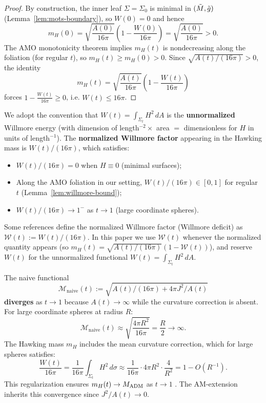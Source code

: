 \begin{proof}
By construction, the inner leaf $\Sigma = \Sigma_0$ is minimal in $(\tilde{M}, \tilde{g})$ (Lemma~\ref{lem:mots-boundary}), so $W(0)=0$ and hence
\[
m_H(0) = \sqrt{\frac{A(0)}{16\pi}}\left(1-\frac{W(0)}{16\pi}\right)=\sqrt{\frac{A(0)}{16\pi}}>0.
\]
The AMO monotonicity theorem implies $m_H(t)$ is nondecreasing along the foliation (for regular $t$), so $m_H(t) \ge m_H(0) > 0$.
Since $\sqrt{A(t)/(16\pi)}>0$, the identity
\[
m_H(t)=\sqrt{\frac{A(t)}{16\pi}}\left(1-\frac{W(t)}{16\pi}\right)
\]
forces $1-\frac{W(t)}{16\pi} \ge 0$, i.e. $W(t)\le 16\pi$.
\end{proof}

\begin{remark}\label{rem:willmore-notation}
We adopt the convention that $W(t) = \int_{\Sigma_t} H^2 \, dA$ is the \textbf{unnormalized} Willmore energy (with dimension of length$^{-2} \times$ area $=$ dimensionless for $H$ in units of length$^{-1}$). The \textbf{normalized Willmore factor} appearing in the Hawking mass is $W(t)/(16\pi)$, which satisfies:
\begin{itemize}
    \item $W(t)/(16\pi) = 0$ when $H \equiv 0$ (minimal surfaces);
    \item Along the AMO foliation in our setting, $W(t)/(16\pi) \in [0,1]$ for regular $t$ (Lemma~\ref{lem:willmore-bound});
    \item $W(t)/(16\pi) \to 1^-$ as $t \to 1$ (large coordinate spheres).
\end{itemize}
Some references define the normalized Willmore factor (Willmore deficit) as $\mathcal{W}(t) := W(t)/(16\pi)$. In this paper we use $\mathcal{W}(t)$ whenever the normalized quantity appears (so $m_H(t) = \sqrt{A(t)/(16\pi)}(1 - \mathcal{W}(t))$), and reserve $W(t)$ for the unnormalized functional $W(t) = \int_{\Sigma_t} H^2\,dA$.
\end{remark}

\begin{remark}\label{rem:hawking-essential}
The naive functional 
\[
\mathcal{M}_{\text{naive}}(t) := \sqrt{A(t)/(16\pi) + 4\pi J^2/A(t)}
\]
\textbf{diverges} as $t \to 1$ because $A(t) \to \infty$ while the curvature correction is absent. For large coordinate spheres at radius $R$:
\[
\mathcal{M}_{\text{naive}}(t) \approx \sqrt{\frac{4\pi R^2}{16\pi}} = \frac{R}{2} \to \infty.
\]
The Hawking mass $m_H$ includes the mean curvature correction, which for large spheres satisfies:
\[
\frac{W(t)}{16\pi} = \frac{1}{16\pi}\int_{\Sigma_t} H^2 \, d\sigma \approx \frac{1}{16\pi} \cdot 4\pi R^2 \cdot \frac{4}{R^2} = 1 - O(R^{-1}).
\]
This regularization ensures $m_H(t) \to M_{\mathrm{ADM}}$ as $t \to 1$ \cite{huisken2001, amo2022}. The AM-extension inherits this convergence since $J^2/A(t) \to 0$.
\end{remark}

